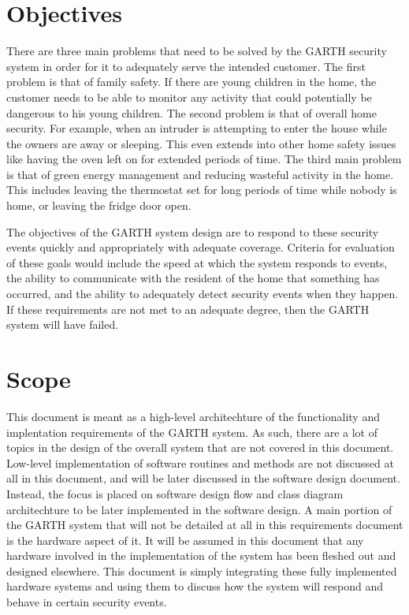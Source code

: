 \documentclass{report}
\begin{document}
\section{Objectives}
There are three main problems that need to be solved by the GARTH security system
in order for it to adequately serve the intended customer. The first problem is that of
family safety. If there are young children in the home, the customer needs to be able
to monitor any activity that could potentially be dangerous to his young children. The
second problem is that of overall home security. For example, when an intruder
is attempting to enter the house while the owners are away or sleeping. This even
extends into other home safety issues like having the oven left on for extended
periods of time. The third main problem is that of green energy management and
reducing wasteful activity in the home. This includes leaving the thermostat
set for long periods of time while nobody is home, or leaving the fridge door
open. 

The objectives of the GARTH system design are to respond to these security
events quickly and appropriately with adequate coverage.  Criteria for
evaluation of these goals would include the speed at which the system responds
to events, the ability to communicate with the resident of the home that
something has occurred, and the ability to adequately detect security events
when they happen. If these requirements are not met to an adequate degree, then
the GARTH system will have failed.

\section{Scope}
This document is meant as a high-level architechture of the functionality and implentation
requirements of the GARTH system. As such, there are a lot of topics in the design of the 
overall system that are not covered in this document. Low-level implementation of software
routines and methods are not discussed at all in this document, and will be later discussed
in the software design document. Instead, the focus is placed on software design flow
and class diagram architechture to be later implemented in the software design. A main 
portion of the GARTH system that will not be detailed at all in this requirements document is 
the hardware aspect of it. It will be assumed in this document that any hardware involved in 
the implementation of the system has been fleshed out and designed elsewhere. This document
is simply integrating these fully implemented hardware systems and using them to discuss how 
the system will respond and behave in certain security events.
\end{document}
